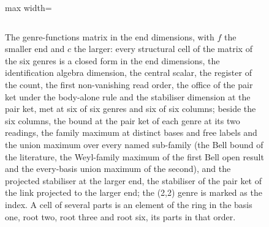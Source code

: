 \begin{figure}[htbp]
\begin{adjustbox}{max width=\linewidth}
\begin{tabular}{|p{13mm}|p{11mm}|p{9mm}|p{12mm}|p{11mm}|p{33mm}|p{12mm}|p{19mm}|p{22mm}|p{13mm}|}
\end{tabular}\end{adjustbox}
\caption{The genre-functions matrix in the end dimensions, with $f$ the smaller end and $c$ the larger: every structural cell of the matrix of the six genres is a closed form in the end dimensions, the identification algebra dimension, the central scalar, the register of the count, the first non-vanishing read order, the office of the pair ket under the body-alone rule and the stabiliser dimension at the pair ket, met at six of six genres and six of six columns; beside the six columns, the bound at the pair ket of each genre at its two readings, the family maximum at distinct bases and free labels and the union maximum over every named sub-family (the Bell bound of the literature, the Weyl-family maximum of the first Bell open result and the every-basis union maximum of the second), and the projected stabiliser at the larger end, the stabiliser of the pair ket of the link projected to the larger end; the (2,2) genre is marked as the index. A cell of several parts is an element of the ring in the basis one, root two, root three and root six, its parts in that order.}\label{fig:I-2-D542526-genre-functions-matrix}
\end{figure}

